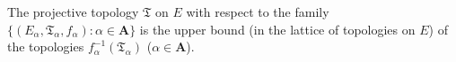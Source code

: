 The projective topology $\mathfrak{T}$ on $E$ with respect to the family $\{(E_\alpha, \mathfrak{T}_\alpha, f_\alpha): \alpha \in \mathbf{A}\}$ is the upper bound (in the lattice of topologies on $E$) of the topologies $f_\alpha^{-1}(\mathfrak{T}_\alpha)$ ($\alpha \in \mathbf{A}$).
